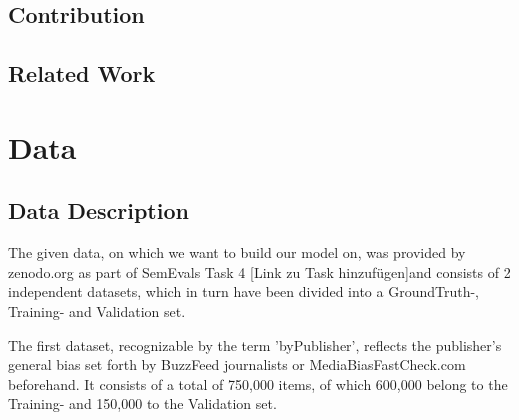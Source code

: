 \documentclass[a4paper, 11pt,titlepage,oneside,openany]{book}
\begin{document}
 

\section{Contribution}

 

\section{Related Work}


\chapter{Data}
\label{cha:theory}


\section{Data Description}
 The given data, on which we want to build our model on, was provided by zenodo.org as part of SemEvals Task 4 [Link zu Task hinzufügen]and consists of 2 independent datasets, which in turn have been divided into a GroundTruth-, Training- and Validation set.
 
 \noindent The first dataset, recognizable by the term 'byPublisher', reflects the publisher's general bias set forth by BuzzFeed journalists or MediaBiasFastCheck.com beforehand. It consists of a total of 750,000 items, of which 600,000 belong to the Training- and 150,000 to the Validation set.
 
\end{document}
